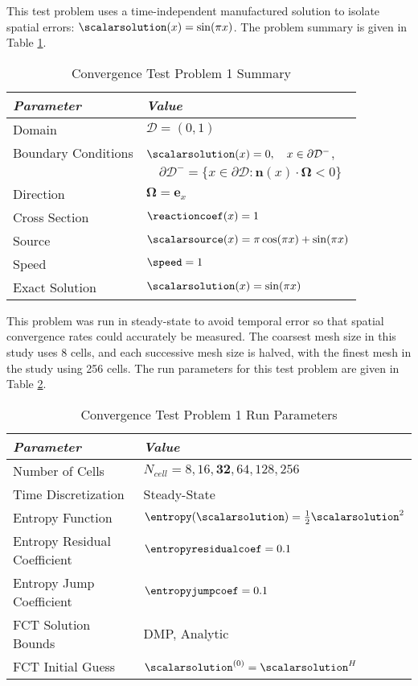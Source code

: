 This test problem uses a time-independent manufactured solution to isolate
spatial errors: $\scalarsolution(x)=\sin(\pi x)$. The problem summary is
given in Table \ref{tab:mms_sinx_ss}.

\begin{table}[htb]\caption{Convergence Test Problem 1 Summary}
\label{tab:mms_sinx_ss}
\centering
\begin{tabular}{l l}\toprule
\emph{Parameter} & \emph{Value}\\\midrule
Domain & $\mathcal{D} = (0,1)$\\
Boundary Conditions & $\scalarsolution(x)=0,\quad x\in\partial\mathcal{D}^-$,\\
   & $\quad\partial\mathcal{D}^-=\{x\in\partial\mathcal{D}:\mathbf{n}(x)
       \cdot\mathbf{\Omega}<0\}$\\
Direction & $\mathbf{\Omega} = \mathbf{e}_x$\\
Cross Section & $\reactioncoef(x)=1$\\
Source & $\scalarsource(x)=\pi\cos(\pi x) + \sin(\pi x)$\\
Speed & $\speed=1$\\
Exact Solution & $\scalarsolution(x)=\sin(\pi x)$\\
\bottomrule\end{tabular}
\end{table}

This problem was run in steady-state to avoid temporal error so that spatial
convergence rates could accurately be measured.
The coarsest mesh size in this study uses 8 cells, and each successive mesh
size is halved, with the finest mesh in the study using 256 cells.
The run parameters for this test problem are given in Table
\ref{tab:mms_sinx_ss_run_parameters}.

\begin{table}[htb]
\caption{Convergence Test Problem 1 Run Parameters}
\label{tab:mms_sinx_ss_run_parameters}
\centering
\begin{tabular}{l l}\toprule
\emph{Parameter} & \emph{Value}\\\midrule
Number of Cells & $N_{cell} = 8,16,\mathbf{32},64,128,256$\\
Time Discretization & Steady-State\\\midrule
Entropy Function & $\entropy(\scalarsolution) = \frac{1}{2}\scalarsolution^2$\\
Entropy Residual Coefficient & $\entropyresidualcoef = 0.1$\\
Entropy Jump Coefficient & $\entropyjumpcoef = 0.1$\\\midrule
FCT Solution Bounds & DMP, Analytic\\
FCT Initial Guess & $\scalarsolution^{(0)} = \scalarsolution^H$\\
\bottomrule\end{tabular}
\end{table}


